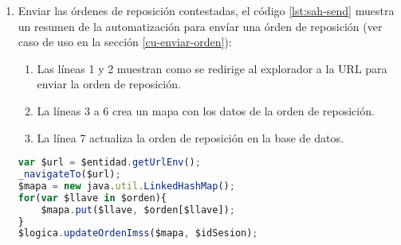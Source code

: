 \begin{enumerate}
	\item Enviar las órdenes de reposición contestadas, el código \ref{lst:sah-send} muestra un resumen de la automatización para envíar una órden de reposición (ver caso de uso en la sección \ref{cu-enviar-orden}):
	\begin{enumerate}
		\item Las líneas 1 y 2 muestran como se redirige al explorador a la URL para enviar la orden de reposición.
		\item La líneas 3 a 6 crea un mapa con los datos de la orden de reposición.
		\item La línea 7 actualiza la orden de reposición en la base de datos. 
	\end{enumerate}
	\begin{lstlisting}[language=Javascript, caption={Enviar orden de reposición.}, label={lst:sah-send}]
var $url = $entidad.getUrlEnv();
_navigateTo($url);
$mapa = new java.util.LinkedHashMap();
for(var $llave in $orden){
	$mapa.put($llave, $orden[$llave]);
}
$logica.updateOrdenImss($mapa, $idSesion);
	\end{lstlisting}
\end{enumerate}

